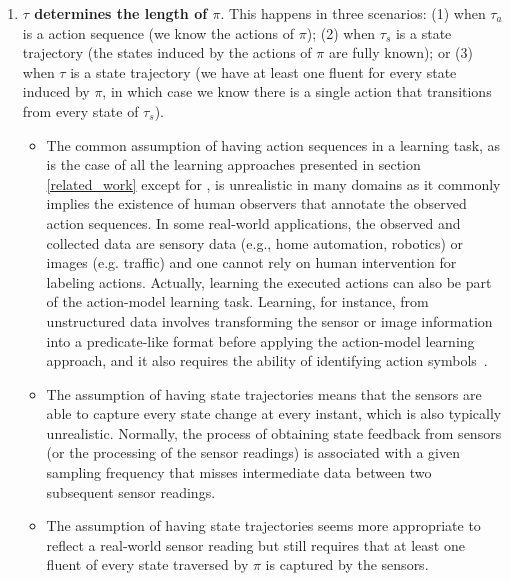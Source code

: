 \begin{enumerate}
\item \textbf{$\tau$ determines the length of $\pi$}. This happens in three scenarios: (1) when $\tau_a$ is a \FO action sequence (we know the actions of $\pi$); (2) when $\tau_s$ is a \FO state trajectory (the states induced by the actions of $\pi$ are fully known); or (3) when $\tau$ is a \POstar state trajectory (we have at least one fluent for every state induced by $\pi$, in which case we know there is a single action that transitions from every state of $\tau_s$).

    \begin{itemize}
    \item The common assumption of having \FO action sequences in a learning task, as is the case of all the learning approaches presented in section \ref{related_work} except for \FAMA, is unrealistic in many domains as it commonly implies the existence of human observers that annotate the observed action sequences. In some real-world applications, the observed and collected data are sensory data (e.g., home automation, robotics) or images (e.g. traffic) and one cannot rely on human intervention for labeling actions. Actually, learning the executed actions can also be part of the action-model learning task. Learning, for instance, from unstructured data involves transforming the sensor or image information into a predicate-like format before applying the action-model learning approach, and it also requires the ability of identifying action symbols~\cite{AsaiF18}.
    \item The assumption of having \FO state trajectories means that the sensors are able to capture every state change at every instant, which is also typically unrealistic. Normally, the process of obtaining state feedback from sensors (or the processing of the sensor readings) is associated with a given sampling frequency that misses intermediate data between two subsequent sensor readings.
    \item The assumption of having \POstar state trajectories seems more appropriate to reflect a real-world sensor reading but still requires that at least one fluent of every state traversed by $\pi$ is captured by the sensors.
    \end{itemize}


\end{enumerate}
